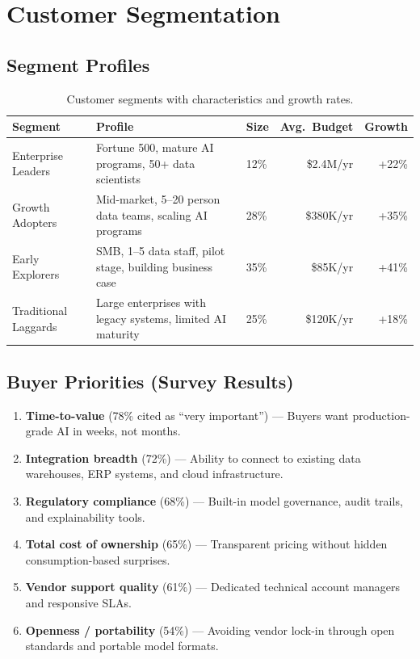 \documentclass[
    language=english,
    doctype=market-analysis,
    institution=none,
]{../../omnilatex}
\begin{document}
\section{Customer Segmentation}

\subsection{Segment Profiles}

\begin{table}[h]
    \centering
    \begin{tabular}{lp{3.5cm}lrr}
        \toprule
        \textbf{Segment} & \textbf{Profile} & \textbf{Size} & \textbf{Avg.\ Budget} & \textbf{Growth} \\
        \midrule
        Enterprise Leaders & Fortune 500, mature AI programs, 50+ data
            scientists & 12\% & \$2.4M/yr & +22\% \\
        Growth Adopters & Mid-market, 5--20 person data teams, scaling
            AI programs & 28\% & \$380K/yr & +35\% \\
        Early Explorers & SMB, 1--5 data staff, pilot stage, building
            business case & 35\% & \$85K/yr & +41\% \\
        Traditional Laggards & Large enterprises with legacy systems,
            limited AI maturity & 25\% & \$120K/yr & +18\% \\
        \bottomrule
    \end{tabular}
    \caption{Customer segments with characteristics and growth rates.}
\end{table}

\subsection{Buyer Priorities (Survey Results)}

\begin{enumerate}
    \item \textbf{Time-to-value} (78\% cited as ``very important'') ---
        Buyers want production-grade AI in weeks, not months.
    \item \textbf{Integration breadth} (72\%) --- Ability to connect to
        existing data warehouses, ERP systems, and cloud infrastructure.
    \item \textbf{Regulatory compliance} (68\%) --- Built-in model
        governance, audit trails, and explainability tools.
    \item \textbf{Total cost of ownership} (65\%) --- Transparent pricing
        without hidden consumption-based surprises.
    \item \textbf{Vendor support quality} (61\%) --- Dedicated technical
        account managers and responsive SLAs.
    \item \textbf{Openness / portability} (54\%) --- Avoiding vendor lock-in
        through open standards and portable model formats.
\end{enumerate}
\end{document}
